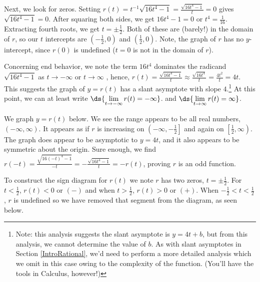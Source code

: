 \documentclass{ximera}
\begin{document}
\begin{example}
\begin{enumerate}
Next, we look for zeros.  Setting $r(t) = t^{-1} \sqrt{16t^4-1} = \frac{\sqrt{16t^4-1}}{t}=0$ gives $\sqrt{16t^4-1} = 0$.  After squaring both sides, we get $16t^4-1 = 0$ or $t^4 = \frac{1}{16}$.  Extracting fourth roots, we get $t = \pm \frac{1}{2}$. Both of these are (barely!) in the domain of $r$, so our $t$ intercepts are $\left( -\frac{1}{2}, 0\right)$ and $\left( \frac{1}{2}, 0\right)$.  Note, the graph of $r$ has no $y$-intercept, since $r(0)$ is undefined ($t=0$ is not in the domain of $r$).  

Concerning end behavior, we note the term $16t^4$ dominates the radicand $\sqrt{16t^4-1}$ as $t \rightarrow - \infty$ or $t \rightarrow \infty$ ,  hence, $r(t) = \frac{\sqrt{16t^4-1}}{t} \approx \frac{\sqrt{16t^4}}{t} = \frac{4t^2}{t} = 4t$.  This suggests the graph of $y = r(t)$ has a slant asymptote with slope $4$.\footnote{Note: this analysis suggests the slant asymptote is $y = 4t+b$, but from this analysis, we cannot determine the value of $b$.  As with slant asymptotes in Section \ref{IntroRational}, we'd need to perform a more detailed analysis which we omit in this case owing to the complexity of the function. (You'll have the tools in Calculus, however!)}  At this point, we can at least write $\ds{\lim_{t \rightarrow -\infty} r(t) = -\infty}$. and $\ds{\lim_{t \rightarrow \infty} r(t) = \infty}$.

We graph $y=r(t)$ below.  We see the range appears to be all real numbers, $(-\infty, \infty)$.  It appears as if $r$ is increasing on $\left(-\infty, -\frac{1}{2} \right]$ and again on $\left[\frac{1}{2}, \infty \right)$.  The graph does appear to be asymptotic to $y = 4t$, and it also appears to be symmetric about the origin.  Sure enough, we find  $r(-t) = \frac{\sqrt{16(-t)^4-1}}{-t}  = - \frac{\sqrt{16t^4-1}}{t} = -r(t)$, proving $r$ is an odd function.

\begin{center}
\end{center}



To construct the sign diagram for $r(t)$ we note $r$ has two zeros, $t = \pm \frac{1}{2}$.  For $t < \frac{1}{2}$, $r(t) < 0$ or $(-)$ and when $t > \frac{1}{2}$, $r(t) > 0$ or $(+)$.  When $-\frac{1}{2} < t < \frac{1}{2}$, $r$ is undefined so we have removed that segment from the diagram, as seen below.

\begin{center}


\end{center}
\end{enumerate}
\end{example}
\end{document}
